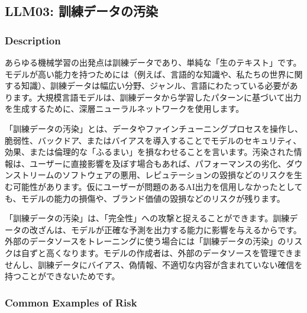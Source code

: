 \documentclass[
]{article}
\author{}
\date{}
\begin{document}
\subsection{LLM03:
訓練データの汚染}\label{llm03-ux8a13ux7df4ux30c7ux30fcux30bfux306eux6c5aux67d3}

\subsubsection{Description}\label{description}

あらゆる機械学習の出発点は訓練データであり、単純な「生のテキスト」です。モデルが高い能力を持つためには（例えば、言語的な知識や、私たちの世界に関する知識）、訓練データは幅広い分野、ジャンル、言語にわたっている必要があります。大規模言語モデルは、訓練データから学習したパターンに基づいて出力を生成するために、深層ニューラルネットワークを使用します。

「訓練データの汚染」とは、データやファインチューニングプロセスを操作し、脆弱性、バックドア、またはバイアスを導入することでモデルのセキュリティ、効果、または倫理的な「ふるまい」を損なわせることを言います。汚染された情報は、ユーザーに直接影響を及ぼす場合もあれば、パフォーマンスの劣化、ダウンストリームのソフトウェアの悪用、レピュテーションの毀損などのリスクを生む可能性があります。仮にユーザーが問題のあるAI出力を信用しなかったとしても、モデルの能力の損傷や、ブランド価値の毀損などのリスクが残ります。

「訓練データの汚染」は、「完全性」への攻撃と捉えることができます。訓練データの改ざんは、モデルが正確な予測を出力する能力に影響を与えるからです。外部のデータソースをトレーニングに使う場合には「訓練データの汚染」のリスクは自ずと高くなります。モデルの作成者は、外部のデータソースを管理できませんし、訓練データにバイアス、偽情報、不適切な内容が含まれていない確信を持つことができないためです。

\subsubsection{Common Examples of Risk}\label{common-examples-of-risk}
\end{document}
